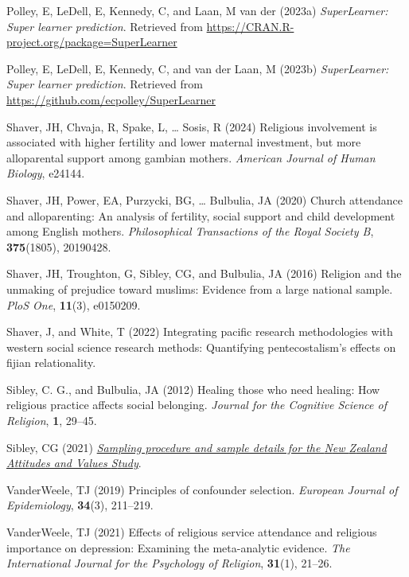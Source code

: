 \documentclass[
  single column]{article}
\newlength{\cslhangindent}
\newenvironment{CSLReferences}[2] %
 {\begin{list}{}{%
  \setlength{\itemindent}{0pt}
  \setlength{\leftmargin}{0pt}
  \setlength{\parsep}{0pt}
  \ifodd #1
   \setlength{\leftmargin}{\cslhangindent}
   \setlength{\itemindent}{-1\cslhangindent}
  \fi
  \setlength{\itemsep}{#2\baselineskip}}}
 {\end{list}}
\begin{document}
\begin{CSLReferences}{1}{0}
Polley, E, LeDell, E, Kennedy, C, and Laan, M van der (2023a)
\emph{SuperLearner: Super learner prediction}. Retrieved from
\url{https://CRAN.R-project.org/package=SuperLearner}

Polley, E, LeDell, E, Kennedy, C, and van der Laan, M (2023b)
\emph{SuperLearner: Super learner prediction}. Retrieved from
\url{https://github.com/ecpolley/SuperLearner}

Shaver, JH, Chvaja, R, Spake, L, \ldots{} Sosis, R (2024) Religious
involvement is associated with higher fertility and lower maternal
investment, but more alloparental support among gambian mothers.
\emph{American Journal of Human Biology}, e24144.

Shaver, JH, Power, EA, Purzycki, BG, \ldots{} Bulbulia, JA (2020) Church
attendance and alloparenting: An analysis of fertility, social support
and child development among {E}nglish mothers. \emph{Philosophical
Transactions of the Royal Society B}, \textbf{375}(1805), 20190428.

Shaver, JH, Troughton, G, Sibley, CG, and Bulbulia, JA (2016) Religion
and the unmaking of prejudice toward muslims: Evidence from a large
national sample. \emph{PloS One}, \textbf{11}(3), e0150209.

Shaver, J, and White, T (2022) Integrating pacific research
methodologies with western social science research methods: Quantifying
pentecostalism's effects on fijian relationality.

Sibley, C. G., and Bulbulia, JA (2012) Healing those who need healing:
How religious practice affects social belonging. \emph{Journal for the
Cognitive Science of Religion}, \textbf{1}, 29--45.

Sibley, CG (2021)
\emph{\href{https://doi.org/10.31234/osf.io/wgqvy}{Sampling procedure
and sample details for the {N}ew {Z}ealand {A}ttitudes and {V}alues
{S}tudy}}.

VanderWeele, TJ (2019) Principles of confounder selection.
\emph{European Journal of Epidemiology}, \textbf{34}(3), 211--219.

VanderWeele, TJ (2021) Effects of religious service attendance and
religious importance on depression: Examining the meta-analytic
evidence. \emph{The International Journal for the Psychology of
Religion}, \textbf{31}(1), 21--26.


\end{CSLReferences}
\end{document}
